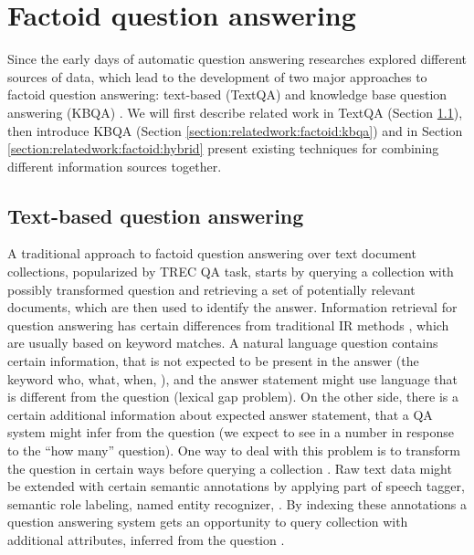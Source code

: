 \section{Factoid question answering}
\label{section:relatedwork:factoid}

Since the early days of automatic question answering researches explored different sources of data, which lead to the development of two major approaches to factoid question answering: text-based (TextQA) and knowledge base question answering (KBQA) \cite{Simmons:1965:AEQ:363707.363732}.
We will first describe related work in TextQA (Section \ref{section:relatedwork:factoid:text}), then introduce KBQA (Section \ref{section:relatedwork:factoid:kbqa}) and in Section \ref{section:relatedwork:factoid:hybrid} present existing techniques for combining different information sources together.

\subsection{Text-based question answering}
\label{section:relatedwork:factoid:text}

A traditional approach to factoid question answering over text document collections, popularized by TREC QA task, starts by querying a collection with possibly transformed question and retrieving a set of potentially relevant documents, which are then used to identify the answer.
Information retrieval for question answering has certain differences from traditional IR methods \cite{keikha2014retrieving}, which are usually based on keyword matches.
A natural language question contains certain information, that is not expected to be present in the answer (\eg the keyword who, what, when, \etc), and the answer statement might use language that is different from the question (lexical gap problem).
On the other side, there is a certain additional information about expected answer statement, that a QA system might infer from the question (\eg we expect to see in a number in response to the ``how many'' question).
One way to deal with this problem is to transform the question in certain ways before querying a collection \cite{AgichteinLG01,brill_askmsr}.
Raw text data might be extended with certain semantic annotations by applying part of speech tagger, semantic role labeling, named entity recognizer, \etc.
By indexing these annotations a question answering system gets an opportunity to query collection with additional attributes, inferred from the question \cite{bilotti2007structured,yao2013automatic}.

